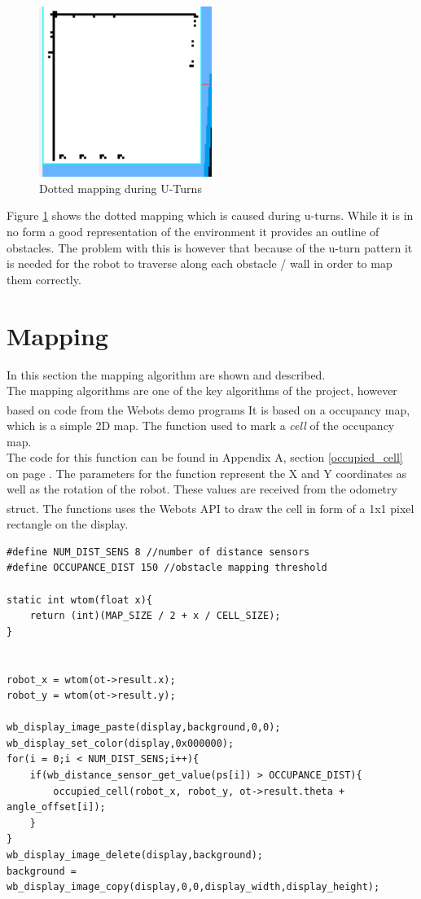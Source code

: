 \begin{figure}[h]
\centering
\includegraphics[width = 0.5\textwidth]{../../figures/map_results/dotted_uturn_mapping.png}
\caption{Dotted mapping during U-Turns}
\label{dotted_uturn}
\end{figure}

Figure \ref{dotted_uturn} shows the dotted mapping which is caused during u-turns. While it is in no form a good representation of the environment it provides an outline of obstacles. The problem with this is however that because of the u-turn pattern it is needed for the robot to traverse along each obstacle / wall in order to map them correctly.

\section{Mapping}
In this section the mapping algorithm are shown and described. \\
The mapping algorithms are one of the key algorithms of the project, however based on code from the Webots\textsuperscript{\texttrademark} demo programs It is based on a occupancy map, which is a simple 2D map. The function used to mark a \textit{cell} of the occupancy map.\\
The code for this function can be found in Appendix A, section \ref{occupied_cell} on page \pageref{occupied_cell}.
The parameters for the function represent the X and Y coordinates as well as the rotation of the robot. These values are received from the odometry struct.
The functions uses the Webots\textsuperscript{\texttrademark}  API to draw the cell in form of a 1x1 pixel rectangle on the display.

\begin{lstlisting}[caption={obstacle detection and mapping}]
#define NUM_DIST_SENS 8 //number of distance sensors
#define OCCUPANCE_DIST 150 //obstacle mapping threshold

static int wtom(float x){
    return (int)(MAP_SIZE / 2 + x / CELL_SIZE);
}


robot_x = wtom(ot->result.x);
robot_y = wtom(ot->result.y);

wb_display_image_paste(display,background,0,0);
wb_display_set_color(display,0x000000);
for(i = 0;i < NUM_DIST_SENS;i++){
    if(wb_distance_sensor_get_value(ps[i]) > OCCUPANCE_DIST){
        occupied_cell(robot_x, robot_y, ot->result.theta + angle_offset[i]);
    }
}
wb_display_image_delete(display,background);
background = wb_display_image_copy(display,0,0,display_width,display_height);
\end{lstlisting}

